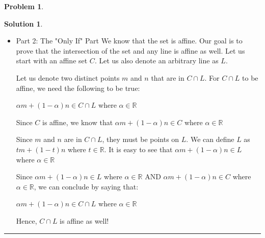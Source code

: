 \documentclass{article}
\theoremstyle{definition}
\newtheorem{problem}{Problem}
\def\fline{\rule{0.75\linewidth}{0.5pt}}
\newcommand{\finishline}{\begin{center}\fline\end{center}}
\newtheorem*{solution*}{Solution}
\newenvironment{solution}{\begin{solution*}}{{\finishline} \end{solution*}}
\begin{document}
\begin{problem}
\begin{solution}
\begin{itemize}
            \item Part 2: The "Only If" Part \newline 
        We know that the set is affine. Our goal is to prove that the intersection of the set and any line is affine as well. Let us start with an affine set $C$. Let us also denote an arbitrary line as $L$. \newline 

        Let us denote two distinct points $m$ and $n$ that are in $C \cap L$. For $C \cap L$ to be affine, we need the following to be true: \newline 

        $\alpha m + (1 - \alpha)n \in C \cap L$ where $\alpha \in \mathbb{R}$ \newline 

        Since $C$ is affine, we know that \newline 
        $\alpha m + (1 - \alpha)n \in C$ where $\alpha \in \mathbb{R}$ \newline 

        Since $m$ and $n$ are in $C \cap L$, they must be points on $L$. We can define $L$ as $tm + (1 - t)n$ where $t \in \mathbb{R}$. It is easy to see that $\alpha m + (1 - \alpha)n \in L$ where $\alpha \in \mathbb{R}$ \newline 

        Since $\alpha m + (1 - \alpha)n \in L$ where $\alpha \in \mathbb{R}$ AND $\alpha m + (1 - \alpha)n \in C$ where $\alpha \in \mathbb{R}$, we can conclude by saying that: 

        $\alpha m + (1 - \alpha)n \in C \cap L$ where $\alpha \in \mathbb{R}$ \newline 

        Hence, $C \cap L$ is affine as well! 


        \end{itemize}
        
    \end{solution}
\end{problem}
\end{document}
